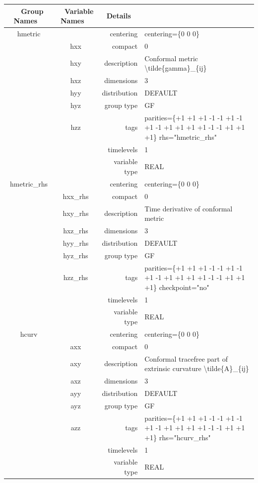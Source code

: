 \begin{tabular*}{150mm}{|c|c@{\extracolsep{\fill}}|rl|} \hline 
~ {\bf Group Names} ~ & ~ {\bf Variable Names} ~  &{\bf Details} ~ & ~ \\ 
\hline 
hmetric &  & centering & centering=\{0 0 0\} \\ 
 & hxx & compact & 0 \\ 
 & hxy & description & Conformal metric {\textbackslash}tilde\{gamma\}\_\{ij\} \\ 
 & hxz & dimensions & 3 \\ 
 & hyy & distribution & DEFAULT \\ 
 & hyz & group type & GF \\ 
 & hzz & tags & parities=\{+1 +1 +1   -1 -1 +1   -1 +1 -1   +1 +1 +1   +1 -1 -1   +1 +1 +1\}  rhs="hmetric\_rhs" \\ 
 &  & timelevels & 1 \\ 
 &  & variable type & REAL \\ 
\hline 
hmetric\_rhs &  & centering & centering=\{0 0 0\} \\ 
 & hxx\_rhs & compact & 0 \\ 
 & hxy\_rhs & description & Time derivative of conformal metric \\ 
 & hxz\_rhs & dimensions & 3 \\ 
 & hyy\_rhs & distribution & DEFAULT \\ 
 & hyz\_rhs & group type & GF \\ 
 & hzz\_rhs & tags & parities=\{+1 +1 +1   -1 -1 +1   -1 +1 -1   +1 +1 +1   +1 -1 -1   +1 +1 +1\}  checkpoint="no" \\ 
 &  & timelevels & 1 \\ 
 &  & variable type & REAL \\ 
\hline 
hcurv &  & centering & centering=\{0 0 0\} \\ 
 & axx & compact & 0 \\ 
 & axy & description & Conformal tracefree part of extrinsic curvature {\textbackslash}tilde\{A\}\_\{ij\} \\ 
 & axz & dimensions & 3 \\ 
 & ayy & distribution & DEFAULT \\ 
 & ayz & group type & GF \\ 
 & azz & tags & parities=\{+1 +1 +1   -1 -1 +1   -1 +1 -1   +1 +1 +1   +1 -1 -1   +1 +1 +1\}  rhs="hcurv\_rhs" \\ 
 &  & timelevels & 1 \\ 
 &  & variable type & REAL \\ 

\end{tabular*}

